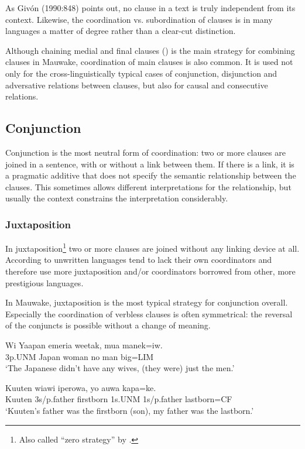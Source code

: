As Giv\'on (1990:848) points out, no clause in a text is truly independent from its context. Likewise, the coordination vs. subordination of clauses is in many languages a matter of degree rather than a clear-cut distinction. 

Although chaining medial and final clauses () is the main strategy for combining clauses in Mauwake, coordination of main clauses is also common. It is used not only for the cross-linguistically typical cases of conjunction, disjunction and adversative relations between clauses, but also for causal and consecutive relations.  

\subsection{Conjunction}
\hypertarget{RefHeading22941935131865}{}
Conjunction is the most neutral form of coordination: two or more clauses are joined in a sentence, with or without a link between them. If there is a link, it is a pragmatic additive that does not specify the semantic relationship between the clauses. This sometimes allows different interpretations for the relationship, but usually the context constrains the interpretation considerably. 

\subsubsection[Juxtaposition]{Juxtaposition}
\hypertarget{RefHeading22961935131865}{}
In juxtaposition\footnote{Also called ``zero strategy'' by \citet[25]{Payne1985}.} two or more clauses are joined without any linking device at all. According to \citet[8]{Haspelmath2007} unwritten languages tend to lack their own coordinators and therefore use more juxtaposition and/or coordinators borrowed  from other, more prestigious languages. 

In Mauwake, juxtaposition is the most typical strategy for conjunction overall. Especially the coordination of verbless clauses is often symmetrical: the reversal of the conjuncts is possible without a change of meaning. 

\ea%
\label{ex:x1367}
\gll Wi  Yaapan  emeria  weetak,  mua  manek=iw. \\
3p.UNM  Japan  woman  no  man  big=LIM\\
\glt `The Japanese didn't have any wives, (they were) just the men.'
\z


\ea%
\label{ex:x1390}
\gll Kuuten  wiawi  iperowa,  yo  auwa  kapa=ke. \\
Kuuten  3s/p.father  firstborn  1s.UNM  1s/p.father  lastborn=CF      \\
\glt `Kuuten's father was the firstborn (son), my father was the lastborn.'
\z




